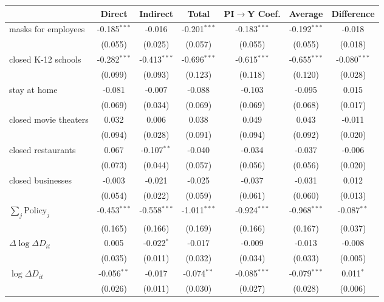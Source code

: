 
\begin{tabular}{lccccc|>{}c}
\toprule
  & Direct & Indirect & Total & PI$\to$Y Coef. & Average & Difference\\
\midrule
masks for employees & -0.185$^{***}$ & -0.016 & -0.201$^{***}$ & -0.183$^{***}$ & -0.192$^{***}$ & -0.018\\
 & (0.055) & (0.025) & (0.057) & (0.055) & (0.055) & (0.018)\\
closed K-12 schools & -0.282$^{***}$ & -0.413$^{***}$ & -0.696$^{***}$ & -0.615$^{***}$ & -0.655$^{***}$ & -0.080$^{***}$\\
 & (0.099) & (0.093) & (0.123) & (0.118) & (0.120) & (0.028)\\
stay at home & -0.081 & -0.007 & -0.088 & -0.103 & -0.095 & 0.015\\
 & (0.069) & (0.034) & (0.069) & (0.069) & (0.068) & (0.017)\\
closed movie theaters & 0.032 & 0.006 & 0.038 & 0.049 & 0.043 & -0.011\\
 & (0.094) & (0.028) & (0.091) & (0.094) & (0.092) & (0.020)\\
closed restaurants & 0.067 & -0.107$^{**}$ & -0.040 & -0.034 & -0.037 & -0.006\\
 & (0.073) & (0.044) & (0.057) & (0.056) & (0.056) & (0.020)\\
closed businesses & -0.003 & -0.021 & -0.025 & -0.037 & -0.031 & 0.012\\
 & (0.054) & (0.022) & (0.059) & (0.061) & (0.060) & (0.013)\\
$\sum_j \mathrm{Policy}_j$ & -0.453$^{***}$ & -0.558$^{***}$ & -1.011$^{***}$ & -0.924$^{***}$ & -0.968$^{***}$ & -0.087$^{**}$\\
 & (0.165) & (0.166) & (0.169) & (0.166) & (0.167) & (0.037)\\
$\Delta \log \Delta D_{it}$ & 0.005 & -0.022$^{*}$ & -0.017 & -0.009 & -0.013 & -0.008\\
 & (0.035) & (0.011) & (0.032) & (0.034) & (0.033) & (0.005)\\
$\log \Delta D_{it}$ & -0.056$^{**}$ & -0.017 & -0.074$^{**}$ & -0.085$^{***}$ & -0.079$^{***}$ & 0.011$^{*}$\\
 & (0.026) & (0.011) & (0.030) & (0.027) & (0.028) & (0.006)\\
\bottomrule
\end{tabular}
